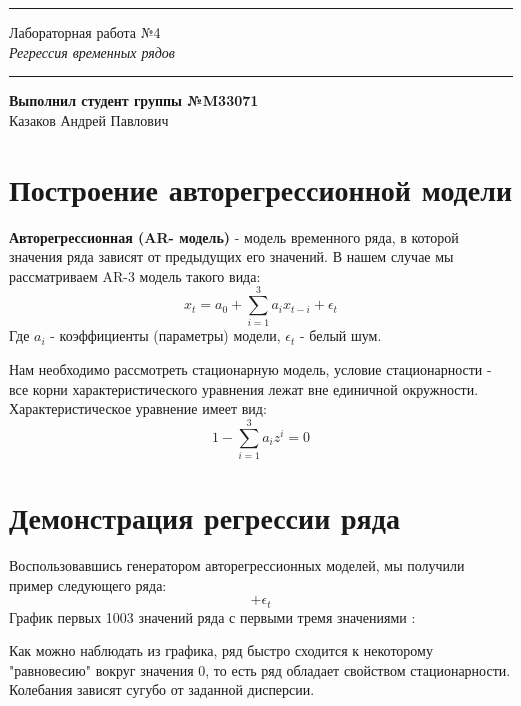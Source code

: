\documentclass{article}
\begin{document}
\hrule
\begin{center}
    \huge
    Лабораторная работа №4 \\
    \vspace{5pt}
    \normalsize
    \textit{Регрессия временных рядов}
\end{center}
\hrule
\begin{flushright}
    \textbf{Выполнил студент группы №M33071} \\
    Казаков Андрей Павлович
\end{flushright}
\section{Построение авторегрессионной модели}
\textbf{Авторегрессионная (AR- модель)} - модель временного ряда, в которой значения ряда зависят от предыдущих его значений. 
В нашем случае мы рассматриваем AR-3 модель такого вида:
$$ x_t = a_0 + \sum_{i=1}^{3} a_i x_{t - i} + \epsilon_t $$
Где $a_i$ - коэффициенты (параметры) модели, $\epsilon_t$ - белый шум.

Нам необходимо рассмотреть стационарную модель, условие стационарности - все корни характеристического уравнения лежат вне единичной окружности.
Характеристическое уравнение имеет вид:
$$ 1 - \sum_{i=1}^3 a_i z^i = 0 $$

\section{Демонстрация регрессии ряда}
Воспользовавшись генератором авторегрессионных моделей, мы получили пример следующего ряда:
$$ + \epsilon_t$$
График первых 1003 значений ряда с первыми тремя значениями $$:

\begin{figure}[h]
    \centering
    
\end{figure}

Как можно наблюдать из графика, ряд быстро сходится к некоторому "равновесию" вокруг значения 0, то есть ряд обладает свойством стационарности.
Колебания зависят сугубо от заданной дисперсии.
\end{document}
